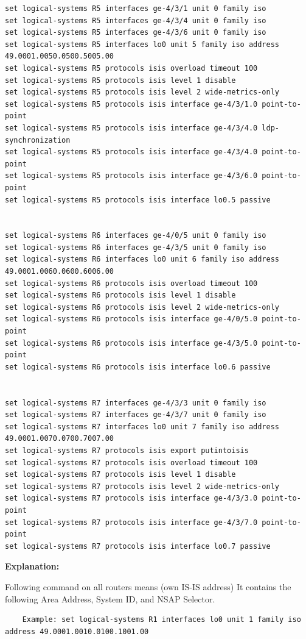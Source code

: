 \documentclass[a4paper]{article}
\begin{document}
\begin{verbatim}
set logical-systems R5 interfaces ge-4/3/1 unit 0 family iso
set logical-systems R5 interfaces ge-4/3/4 unit 0 family iso
set logical-systems R5 interfaces ge-4/3/6 unit 0 family iso
set logical-systems R5 interfaces lo0 unit 5 family iso address 49.0001.0050.0500.5005.00
set logical-systems R5 protocols isis overload timeout 100
set logical-systems R5 protocols isis level 1 disable
set logical-systems R5 protocols isis level 2 wide-metrics-only
set logical-systems R5 protocols isis interface ge-4/3/1.0 point-to-point
set logical-systems R5 protocols isis interface ge-4/3/4.0 ldp-synchronization
set logical-systems R5 protocols isis interface ge-4/3/4.0 point-to-point
set logical-systems R5 protocols isis interface ge-4/3/6.0 point-to-point
set logical-systems R5 protocols isis interface lo0.5 passive


set logical-systems R6 interfaces ge-4/0/5 unit 0 family iso
set logical-systems R6 interfaces ge-4/3/5 unit 0 family iso
set logical-systems R6 interfaces lo0 unit 6 family iso address 49.0001.0060.0600.6006.00
set logical-systems R6 protocols isis overload timeout 100
set logical-systems R6 protocols isis level 1 disable
set logical-systems R6 protocols isis level 2 wide-metrics-only
set logical-systems R6 protocols isis interface ge-4/0/5.0 point-to-point
set logical-systems R6 protocols isis interface ge-4/3/5.0 point-to-point
set logical-systems R6 protocols isis interface lo0.6 passive


set logical-systems R7 interfaces ge-4/3/3 unit 0 family iso
set logical-systems R7 interfaces ge-4/3/7 unit 0 family iso
set logical-systems R7 interfaces lo0 unit 7 family iso address 49.0001.0070.0700.7007.00
set logical-systems R7 protocols isis export putintoisis
set logical-systems R7 protocols isis overload timeout 100
set logical-systems R7 protocols isis level 1 disable
set logical-systems R7 protocols isis level 2 wide-metrics-only
set logical-systems R7 protocols isis interface ge-4/3/3.0 point-to-point
set logical-systems R7 protocols isis interface ge-4/3/7.0 point-to-point
set logical-systems R7 protocols isis interface lo0.7 passive
\end{verbatim}


\textbf{Explanation:}

Following command on all routers means (own IS-IS address) It contains the following Area Address, System ID, and NSAP Selector.

\begin{verbatim}
    Example: set logical-systems R1 interfaces lo0 unit 1 family iso address 49.0001.0010.0100.1001.00
\end{verbatim}
\end{document}
